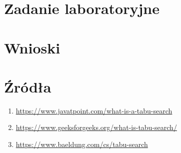 \documentclass{article}
\begin{document}
    \section{Zadanie laboratoryjne}


    \section{Wnioski}


    \section{Źródła}
      \begin{enumerate}[label=\arabic*.]
        \item \url{https://www.javatpoint.com/what-is-a-tabu-search}
        \item \url{https://www.geeksforgeeks.org/what-is-tabu-search/}
        \item \url{https://www.baeldung.com/cs/tabu-search}
      \end{enumerate}
\end{document}
